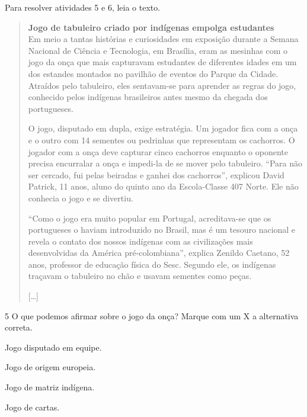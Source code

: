 Para resolver atividades 5 e 6, leia o texto.

\begin{quote}
\textbf{Jogo de tabuleiro criado por indígenas empolga estudantes}\\
Em meio a tantas histórias e curiosidades em exposição durante a Semana
Nacional de Ciência e Tecnologia, em Brasília, eram as mesinhas com o
jogo da onça que mais capturavam estudantes de diferentes idades em um
dos estandes montados no pavilhão de eventos do Parque da Cidade.
Atraídos pelo tabuleiro, eles sentavam-se para aprender as regras do
jogo, conhecido pelos indígenas brasileiros antes mesmo da chegada dos
portugueses.

O jogo, disputado em dupla, exige estratégia. Um jogador fica com a onça
e o outro com 14 sementes ou pedrinhas que representam os cachorros. O
jogador com a onça deve capturar cinco cachorros enquanto o oponente
precisa encurralar a onça e impedi-la de se mover pelo tabuleiro. “Para
não ser cercado, fui pelas beiradas e ganhei dos cachorros”, explicou
David Patrick, 11 anos, aluno do quinto ano da Escola-Classe 407 Norte.
Ele não conhecia o jogo e se divertiu.

“Como o jogo era muito popular em Portugal, acreditava-se que os
portugueses o haviam introduzido no Brasil, mas é um tesouro nacional e
revela o contato dos nossos indígenas com as civilizações mais
desenvolvidas da América pré-colombiana”, explica Zenildo Caetano, 52
anos, professor de educação física do Sesc. Segundo ele, os indígenas
traçavam o tabuleiro no chão e usavam sementes como peças.

{[}\ldots{}{]}

\end{quote}

\num{5} O que podemos afirmar sobre o jogo da onça? Marque com um X a alternativa correta.

\begin{boxlist}
 Jogo disputado em equipe.

 Jogo de origem europeia.

 Jogo de matriz indígena.

 Jogo de cartas.
\end{boxlist}

